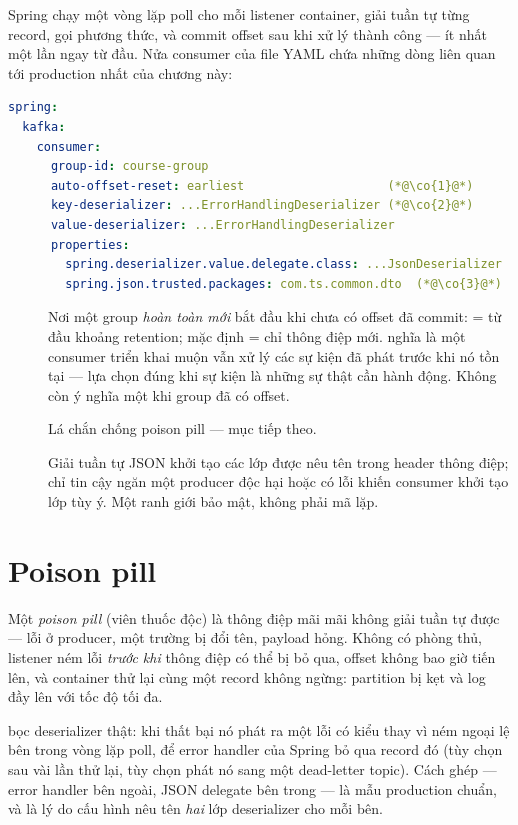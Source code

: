 Spring chạy một vòng lặp poll cho mỗi listener container, giải tuần tự
từng record, gọi phương thức, và commit offset sau khi xử lý thành công
--- ít nhất một lần ngay từ đầu. Nửa consumer của file YAML chứa những
dòng liên quan tới production nhất của chương này:

\begin{lstlisting}[language=yaml]
spring:
  kafka:
    consumer:
      group-id: course-group
      auto-offset-reset: earliest                    (*@\co{1}@*)
      key-deserializer: ...ErrorHandlingDeserializer (*@\co{2}@*)
      value-deserializer: ...ErrorHandlingDeserializer
      properties:
        spring.deserializer.value.delegate.class: ...JsonDeserializer
        spring.json.trusted.packages: com.ts.common.dto  (*@\co{3}@*)
\end{lstlisting}

\begin{description}
  \item[] Nơi một group \emph{hoàn toàn mới} bắt đầu khi chưa có
  offset đã commit:  = từ đầu khoảng retention; mặc định
   = chỉ thông điệp mới.  nghĩa là một
  consumer triển khai muộn vẫn xử lý các sự kiện đã phát trước khi nó tồn
  tại --- lựa chọn đúng khi sự kiện là những sự thật cần hành động. Không
  còn ý nghĩa một khi group đã có offset.
  \item[] Lá chắn chống poison pill --- mục tiếp theo.
  \item[] Giải tuần tự JSON khởi tạo các lớp được nêu tên trong
  header thông điệp; chỉ tin cậy  ngăn một
  producer độc hại hoặc có lỗi khiến consumer khởi tạo lớp tùy ý. Một
  ranh giới bảo mật, không phải mã lặp.
\end{description}

\section{Poison pill}

Một \emph{poison pill} (viên thuốc độc) là thông điệp mãi mãi không giải
tuần tự được --- lỗi ở producer, một trường bị đổi tên, payload hỏng.
Không có phòng thủ, listener ném lỗi \emph{trước khi} thông điệp có thể
bị bỏ qua, offset không bao giờ tiến lên, và container thử lại cùng một
record không ngừng: partition bị kẹt và log đầy lên với tốc độ tối đa.

 bọc deserializer thật: khi thất bại nó
phát ra một lỗi có kiểu thay vì ném ngoại lệ bên trong vòng lặp poll, để
error handler của Spring bỏ qua record đó (tùy chọn sau vài lần thử lại,
tùy chọn phát nó sang một dead-letter topic). Cách ghép --- error handler
bên ngoài, JSON delegate bên trong --- là mẫu production chuẩn, và là lý
do cấu hình nêu tên \emph{hai} lớp deserializer cho mỗi bên.

